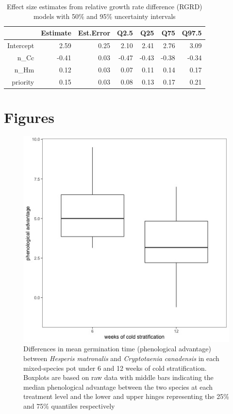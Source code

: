 \documentclass{article}
\begin{document}
\begin{table}[hp]
\centering
\begin{tabular}{rrrrrrr}
  \hline
 & Estimate & Est.Error & Q2.5 & Q25 & Q75 & Q97.5 \\ 
  \hline
Intercept & 2.59 & 0.25 & 2.10 & 2.41 & 2.76 & 3.09 \\ 
  n\_Cc & -0.41 & 0.03 & -0.47 & -0.43 & -0.38 & -0.34 \\ 
  n\_Hm & 0.12 & 0.03 & 0.07 & 0.11 & 0.14 & 0.17 \\ 
  priority & 0.15 & 0.03 & 0.08 & 0.13 & 0.17 & 0.21 \\ 
   \hline
\end{tabular}
\caption{Effect size estimates from relative growth rate difference (RGRD) models with 50\% and 95\% uncertainty intervals}
\label{tab:RGRD}
\end{table}

\pagebreak
\section*{Figures}

\begin{figure}[hp]
    \centering
\includegraphics[width=.7\textwidth]{..//figure/priority_treat.jpeg}
   \caption{Differences in mean germination time (phenological advantage) between \textit{Hesperis matronalis} and \textit{Cryptotaenia canadensis} in each mixed-species pot under 6 and 12 weeks of cold stratification. Boxplots are based on raw data with middle bars indicating the median phenological advantage between the two species at each treatment level and the lower and upper hinges representing the 25\% and 75\% quantiles respectively} 
   \label{fig:MGTsup}
\end{figure}
\end{document}

